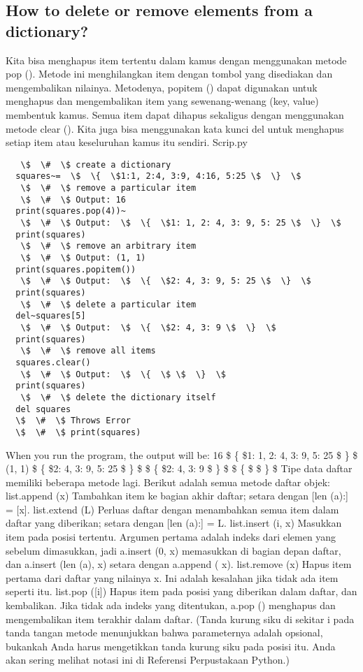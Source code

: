 \subsection{How to delete or remove elements from a dictionary?}
Kita bisa menghapus item tertentu dalam kamus dengan menggunakan metode pop (). Metode ini menghilangkan item dengan tombol yang disediakan dan mengembalikan nilainya. 
Metodenya, popitem () dapat digunakan untuk menghapus dan mengembalikan item yang sewenang-wenang (key, value) membentuk kamus. Semua item dapat dihapus sekaligus dengan menggunakan metode clear (). 
Kita juga bisa menggunakan kata kunci del untuk menghapus setiap item atau keseluruhan kamus itu sendiri. 
Scrip.py
\begin{verbatim}
   \$  \#  \$ create a dictionary 
  squares~=  \$  \{  \$1:1, 2:4, 3:9, 4:16, 5:25 \$  \}  \$   
   \$  \#  \$ remove a particular item 
   \$  \#  \$ Output: 16 
  print(squares.pop(4))~  
   \$  \#  \$ Output:  \$  \{  \$1: 1, 2: 4, 3: 9, 5: 25 \$  \}  \$ 
  print(squares) 
   \$  \#  \$ remove an arbitrary item 
   \$  \#  \$ Output: (1, 1) 
  print(squares.popitem()) 
   \$  \#  \$ Output:  \$  \{  \$2: 4, 3: 9, 5: 25 \$  \}  \$ 
  print(squares) 
   \$  \#  \$ delete a particular item 
  del~squares[5]   
   \$  \#  \$ Output:  \$  \{  \$2: 4, 3: 9 \$  \}  \$ 
  print(squares) 
   \$  \#  \$ remove all items 
  squares.clear() 
   \$  \#  \$ Output:  \$  \{  \$ \$  \}  \$ 
  print(squares) 
   \$  \#  \$ delete the dictionary itself 
  del squares 
  \$  \#  \$ Throws Error 
  \$  \#  \$ print(squares)
\end{verbatim}  
When you run the program, the output will be: 
16 
 \$  \{  \$1: 1, 2: 4, 3: 9, 5: 25 \$  \}  \$ 
(1, 1) 
 \$  \{  \$2: 4, 3: 9, 5: 25 \$  \}  \$ 
 \$  \{  \$2: 4, 3: 9 \$  \}  \$ 
 \$  \{  \$ \$  \}  \$ 
Tipe data daftar memiliki beberapa metode lagi. Berikut adalah semua metode daftar objek: 
list.append (x) 
Tambahkan item ke bagian akhir daftar; setara dengan [len (a):] = [x]. 
list.extend (L) 
Perluas daftar dengan menambahkan semua item dalam daftar yang diberikan; setara dengan [len (a):] = L. 
list.insert (i, x) 
Masukkan item pada posisi tertentu. Argumen pertama adalah indeks dari elemen yang sebelum dimasukkan, jadi a.insert (0, x) memasukkan di bagian depan daftar, dan a.insert (len (a), x) setara dengan a.append ( x). 
list.remove (x) 
Hapus item pertama dari daftar yang nilainya x. Ini adalah kesalahan jika tidak ada item seperti itu. 
list.pop ([i]) 
Hapus item pada posisi yang diberikan dalam daftar, dan kembalikan. Jika tidak ada indeks yang ditentukan, a.pop () menghapus dan mengembalikan item terakhir dalam daftar. (Tanda kurung siku di sekitar i pada tanda tangan metode menunjukkan bahwa parameternya adalah opsional, bukankah Anda harus mengetikkan tanda kurung siku pada posisi itu. Anda akan sering melihat notasi ini di Referensi Perpustakaan Python.) 
